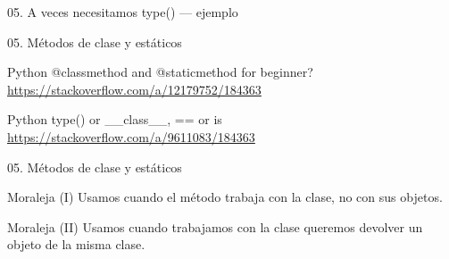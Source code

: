 \begin{frame}{05. A veces necesitamos type() — ejemplo}
  \scriptsize
\end{frame}

\begin{frame}{05. Métodos de clase y estáticos}
  \small
  \begin{block}{\centering Python @classmethod and @staticmethod for beginner?}
    \centering \url{https://stackoverflow.com/a/12179752/184363}
  \end{block}

  \begin{block}{\centering Python type() or \_\_class\_\_, == or is}
    \centering \url{https://stackoverflow.com/a/9611083/184363}
  \end{block}
\end{frame}

\begin{frame}{05. Métodos de clase y estáticos}
  \begin{alertblock}{\centering Moraleja (I)}
    \centering Usamos  cuando el método
    trabaja con la clase, no con sus objetos.
  \end{alertblock}

  \vspace{0.25cm}
  \begin{alertblock}{\centering Moraleja (II)}
    \centering Usamos  cuando trabajamos con
    la clase  queremos devolver un objeto de la misma
    clase.
  \end{alertblock}
\end{frame}
